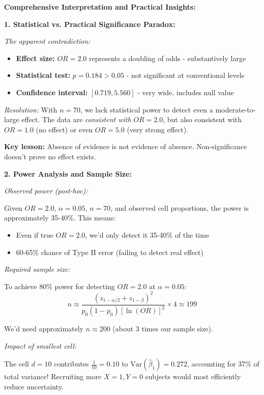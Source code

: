 \documentclass[12pt]{article}
\begin{document}
\begin{explanation}
\textbf{Comprehensive Interpretation and Practical Insights:}

\textbf{1. Statistical vs. Practical Significance Paradox:}

\textit{The apparent contradiction:}
\begin{itemize}
\item \textbf{Effect size:} $OR = 2.0$ represents a doubling of odds - substantively large
\item \textbf{Statistical test:} $p = 0.184 > 0.05$ - not significant at conventional levels
\item \textbf{Confidence interval:} $[0.719, 5.560]$ - very wide, includes null value
\end{itemize}

\textit{Resolution:} With $n=70$, we lack statistical power to detect even a moderate-to-large effect. The data are \textit{consistent with} $OR=2.0$, but also consistent with $OR=1.0$ (no effect) or even $OR=5.0$ (very strong effect).

\textbf{Key lesson:} Absence of evidence is not evidence of absence. Non-significance doesn't prove no effect exists.

\textbf{2. Power Analysis and Sample Size:}

\textit{Observed power (post-hoc):}

Given $OR = 2.0$, $\alpha = 0.05$, $n = 70$, and observed cell proportions, the power is approximately 35-40\%. This means:
\begin{itemize}
\item Even if true $OR = 2.0$, we'd only detect it 35-40\% of the time
\item 60-65\% chance of Type II error (failing to detect real effect)
\end{itemize}

\textit{Required sample size:}

To achieve 80\% power for detecting $OR = 2.0$ at $\alpha = 0.05$:
\[
n \approx \frac{(z_{1-\alpha/2} + z_{1-\beta})^2}{p_0(1-p_0)[\ln(OR)]^2} \times 4 \approx 199
\]

We'd need approximately $n \approx 200$ (about 3 times our sample size).

\textit{Impact of smallest cell:}

The cell $d = 10$ contributes $\frac{1}{10} = 0.10$ to $\text{Var}(\hat{\beta}_1) = 0.272$, accounting for 37\% of total variance! Recruiting more $X=1, Y=0$ subjects would most efficiently reduce uncertainty.


\end{explanation}
\end{document}

